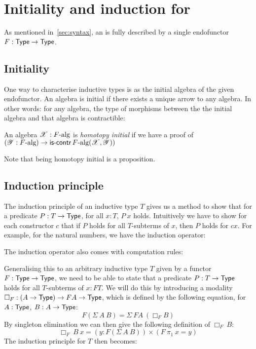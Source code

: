\documentclass[a4paper,10pt]{article}
\begin{document}
\section{Initiality and induction for \oits}
\label{sec:oits}

As mentioned in~\cref{sec:syntax}, an \oit is fully described by a
single endofunctor $F : \mathsf{Type} \to \mathsf{Type}$.



\subsection{Initiality}
\label{sec:oitinitiality}

One way to characterise inductive types is as the initial algebra of
the given endofunctor. An algebra is initial if there exists a unique
arrow to any algebra. In other words: for any algebra, the type of
morphisms between the the initial algebra and that algebra is
contractible:
%
\begin{defn}
  An algebra $\mathscr{X} : F\mbox{-alg}$ is \emph{homotopy initial} if we
  have a proof of
  $(\mathscr{Y} : F\mbox{-alg}) \to \operatorname{\mathsf{is-contr}}{F\mbox{-alg}(\mathscr{X}, \mathscr{Y})})$
\end{defn}
%
Note that being homotopy initial is a proposition.

\subsection{Induction principle}
\label{sec:oitinduction}

The induction principle of an inductive type $T$ gives us a method to
show that for a predicate $P : T \to \mathsf{Type}$, for all $x : T$, $P\ x$
holds. Intuitively we have to show for each constructor $c$ that if
$P$ holds for all $T$-subterms of $x$, then $P$ holds for $c x$. For
example, for the natural numbers, we have the induction operator:


The induction operator also comes with computation rules:


Generalising this to an arbitrary inductive type $T$ given by a
functor $F : \mathsf{Type} \to \mathsf{Type}$, we need to be able to state that a
predicate $P : T \to \mathsf{Type}$ holds for all $T$-subterms of $x : FT$. We
will do this by introducing a modality
$\Box_F : (A \to \mathsf{Type}) \to FA \to \mathsf{Type}$, which is defined by the
following equation, for $A : \mathsf{Type}$, $B : A \to \mathsf{Type}$:
$$
F (\Sigma\ A\ B) = \Sigma\ FA\ (\Box_{F} B)
$$
By singleton elimination we can then give the following definition of $\Box_{F}\ B$:
$$
\Box_{F}\ B\ x = (y : F (\Sigma\ A\ B)) \times (F\ \pi_1\ x = y)
$$
The induction principle for $T$ then becomes:
\end{document}
